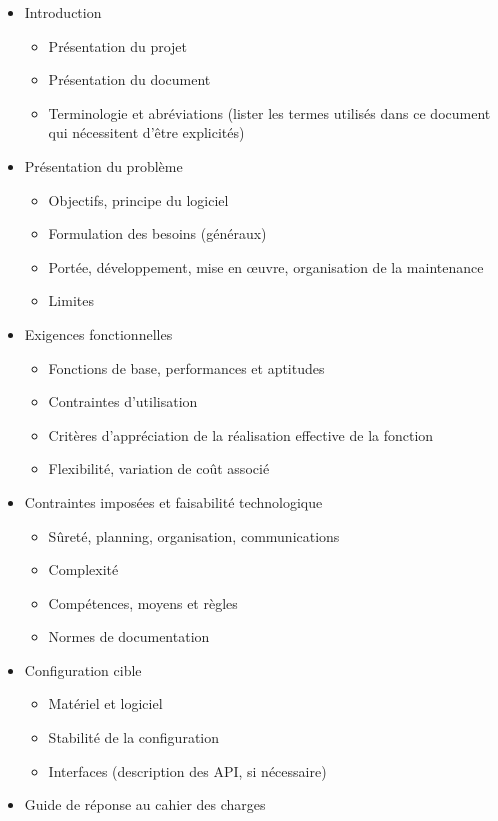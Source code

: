 \documentclass[a4paper]{article}
\begin{document}
\begin{itemize}
\item Introduction
  \begin{itemize}
  \item Présentation du projet
  \item Présentation du document
  \item Terminologie et abréviations
    (lister les termes utilisés dans ce document qui nécessitent d'être explicités)
  \end{itemize}
\item Présentation du problème
  \begin{itemize}
  \item Objectifs, principe du logiciel
  \item Formulation des besoins (généraux)
  \item Portée, développement, mise en œuvre, organisation de la maintenance
  \item Limites
  \end{itemize}
\item Exigences fonctionnelles
  \begin{itemize}
  \item Fonctions de base, performances et aptitudes
  \item Contraintes d'utilisation
  \item Critères d'appréciation de la réalisation effective de la fonction
  \item Flexibilité, variation de coût associé
  \end{itemize}
\item Contraintes imposées et faisabilité technologique
  \begin{itemize}
  \item Sûreté, planning, organisation, communications
  \item Complexité
  \item Compétences, moyens et règles
  \item Normes de documentation
  \end{itemize}
\item Configuration cible
  \begin{itemize}
  \item Matériel et logiciel
  \item Stabilité de la configuration
  \item Interfaces (description des API, si nécessaire)
  \end{itemize}
\item Guide de réponse au cahier des charges

\end{itemize}
\end{document}
